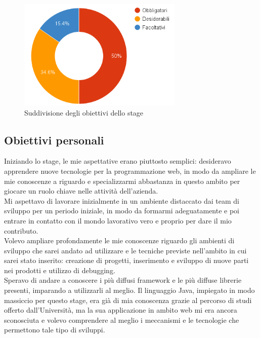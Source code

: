 	\begin{figure}[H]
		\centering
	   	\includegraphics[width=0.7\textwidth]{immagini/suddivisione_obiettivi}
	   	\caption{Suddivisione degli obiettivi dello stage}
	   	\vspace{2mm}
	   	\label{suddivisione-obiettivi}
	\end{figure}

	\subsection{Obiettivi personali}
	
	Iniziando lo stage, le mie aspettative erano piuttosto semplici: desideravo apprendere nuove tecnologie per la programmazione web, in modo da ampliare le mie conoscenze a riguardo e specializzarmi abbastanza in questo ambito per giocare un ruolo chiave nelle attività dell'azienda.\\
	
	Mi aspettavo di lavorare inizialmente in un ambiente distaccato dai team di sviluppo per un periodo iniziale, in modo da formarmi adeguatamente e poi entrare in contatto con il mondo lavorativo vero e proprio per dare il mio contributo.\\
	
	Volevo ampliare profondamente le mie conoscenze riguardo gli ambienti di sviluppo che sarei andato ad utilizzare e le tecniche previste nell'ambito in cui sarei stato inserito: creazione di progetti, inserimento e sviluppo di nuove parti nei prodotti e utilizzo di debugging.\\
	
	Speravo di andare a conoscere i più diffusi framework e le più diffuse librerie	presenti, imparando a utilizzarli al meglio. Il linguaggio Java, impiegato in modo massiccio per questo stage, era già di mia conoscenza grazie al percorso di studi offerto dall'Università, ma la sua applicazione in ambito web mi era ancora sconosciuta e volevo comprendere al meglio i meccanismi e le tecnologie che permettono tale tipo di sviluppi.\\
	
